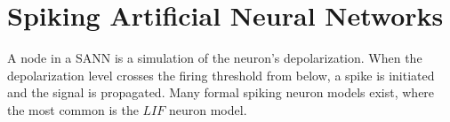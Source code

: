 \section{Spiking Artificial Neural Networks}
	\label{ssecDepolarizationSimulationByNIM}
	A node in a SANN is a simulation of the neuron's depolarization.
	When the depolarization level crosses the firing threshold from below, a spike is initiated and the signal is propagated.
	Many formal spiking neuron models exist, where the most common is the $LIF$ neuron model\cite{florian03}. %
	
